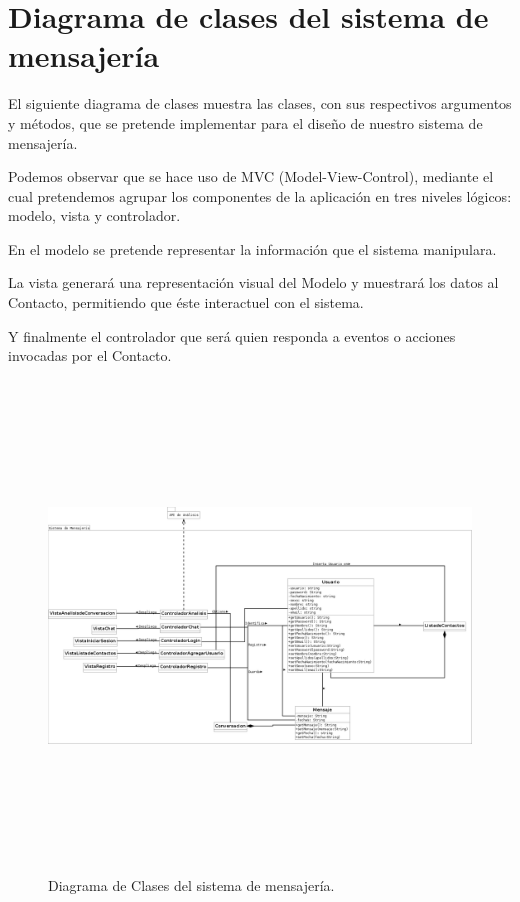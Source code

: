 \section{Diagrama de clases del sistema de mensajer\'ia}

El siguiente diagrama de clases muestra las clases, con sus respectivos argumentos y m\'etodos, que se pretende implementar para el dise\~no de nuestro sistema de mensajer\'ia. 

Podemos observar que se hace uso de MVC (Model-View-Control), mediante el cual pretendemos agrupar los componentes de la aplicaci\'on en tres niveles l\'ogicos: modelo, vista y controlador.

En el modelo se pretende representar la informaci\'on que el sistema manipulara.

La vista generar\'a una representaci\'on visual del Modelo y muestrar\'a los datos al Contacto, permitiendo que \'este interactuel con el sistema.

Y finalmente el controlador que ser\'a quien responda a eventos o acciones invocadas por el Contacto. 



	
	\begin{figure}[htbp!]
		\centering
			\includegraphics[width=18cm, height=13cm]{images/Diagramas/ddclases}
		\caption{Diagrama de Clases del sistema de mensajer\'ia.}
	\end{figure}
	
	

	
	\pagebreak